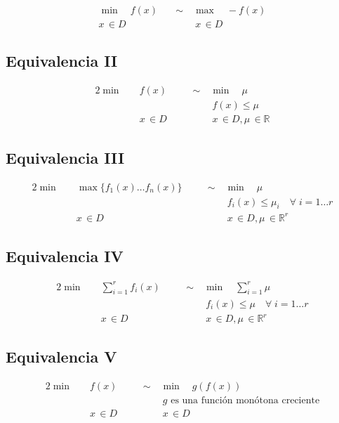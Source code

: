 \documentclass{article}
\begin{document}
\begin{align*}
    \min \quad f(x) \quad & \sim \quad \max \quad -f(x) \\
    x\,\in D & \qquad x\,\in D
\end{align*}

\subsection{Equivalencia II}

\begin{alignat*}{2}
    \min \quad & f(x) \quad && \sim \quad \min \quad \mu \\
    & && \qquad f(x) \leq \mu \\
    & x\,\in D && \qquad x\,\in D, \mu\,\in \mathbb{R}
\end{alignat*}

\subsection{Equivalencia III}

\begin{alignat*}{2}
    \min \quad & \max \{f_1(x)\dots f_n(x)\} \quad && \sim \quad \min \quad \mu \\
    & && \qquad f_i(x) \leq \mu_i \quad \forall \; i =1\dots r\\
    & x\,\in D && \qquad x\,\in D, \mu\,\in \mathbb{R}^r
\end{alignat*}

\subsection{Equivalencia IV}

\begin{alignat*}{2}
    \min \quad & \sum_{i=1}^{r} f_i(x) \quad && \sim \quad \min \quad \sum_{i=1}^{r}\mu \\
    & && \qquad f_i(x) \leq \mu \quad \forall \; i =1\dots r\\
    & x\,\in D && \qquad x\,\in D, \mu\,\in \mathbb{R}^r
\end{alignat*}

\subsection{Equivalencia V}

\begin{alignat*}{2}
    \min \quad & f(x) \quad && \sim \quad \min \quad g(f(x)) \\
    & && \qquad g \text{ es una función monótona creciente} \\
    & x\,\in D && \qquad x\,\in D
\end{alignat*}
\end{document}
